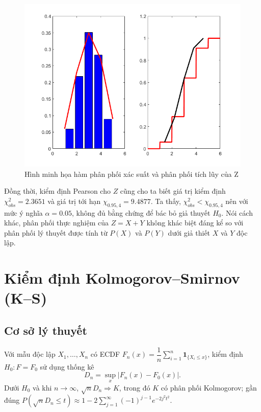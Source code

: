 \begin{figure}[h!]
    \centering
    \includegraphics[width=0.9\linewidth]{../../assets/images/X_Y_PTest.png}
    \caption{Hình minh họa hàm phân phối xác suất và phân phối tích lũy của Z}
    \label{fig:X_Y_PTest}
\end{figure}
Đồng thời, kiểm định Pearson cho $Z$ cũng cho ta biết giá trị kiểm định $\chi_{obs}^2=2.3651$ và giá trị tới hạn $\chi_{0.95,4}=9.4877$. Ta thấy, $\chi_{obs}^2<\chi_{0.95,4}$ nên với mức ý nghĩa $\alpha = 0.05$, không đủ bằng chứng để bác bỏ giả thuyết $H_0$.  Nói cách khác, phân phối thực nghiệm của $Z = X + Y$ không khác biệt đáng kể so với phân phối lý thuyết được tính từ $P(X)$ và $P(Y)$ dưới giả thiết $X$ và $Y$ độc lập.













\section{Kiểm định Kolmogorov--Smirnov (K--S)}

\subsection{Cơ sở lý thuyết}
\begin{dn}
Với mẫu độc lập $X_1,\ldots,X_n$ có ECDF $F_n(x)=\dfrac{1}{n}\sum_{i=1}^n \mathbf{1}_{\{X_i\le x\}}$, kiểm định $H_0:F=F_0$ sử dụng thống kê
\[ D_n=\sup_x |F_n(x)-F_0(x)|. \]
Dưới $H_0$ và khi $n\to\infty$, $\sqrt{n}D_n\Rightarrow K$, trong đó $K$ có phân phối Kolmogorov; gần đúng $P(\sqrt{n}D_n\le t)\approx1-2\sum_{j=1}^{\infty}(-1)^{j-1}e^{-2j^2 t^2}$.
\end{dn}

